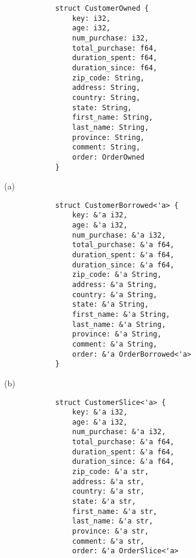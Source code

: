 \begin{figure}[htb]
    \begin{minipage}[t]{0.2\linewidth}\centering
        \begin{lstlisting}
            struct CustomerOwned {
                key: i32,
                age: i32,
                num_purchase: i32,
                total_purchase: f64,
                duration_spent: f64, 
                duration_since: f64,
                zip_code: String,
                address: String,
                country: String,
                state: String,
                first_name: String,
                last_name: String,
                province: String,
                comment: String, 
                order: OrderOwned
            }
        \end{lstlisting}
      \medskip
      \centerline{(a)}
    \end{minipage}\hfill
    \begin{minipage}[t]{0.6\linewidth}\centering
        \begin{lstlisting}
            struct CustomerBorrowed<'a> {
                key: &'a i32,
                age: &'a i32,
                num_purchase: &'a i32,
                total_purchase: &'a f64,
                duration_spent: &'a f64, 
                duration_since: &'a f64,
                zip_code: &'a String,
                address: &'a String,
                country: &'a String,
                state: &'a String,
                first_name: &'a String,
                last_name: &'a String,
                province: &'a String,
                comment: &'a String, 
                order: &'a OrderBorrowed<'a>
            }
        \end{lstlisting}
      \medskip
      \centerline{(b)}
    \end{minipage}
    \begin{minipage}[t]{0.2\linewidth}\centering
        \begin{lstlisting}
            struct CustomerSlice<'a> {
                key: &'a i32,
                age: &'a i32,
                num_purchase: &'a i32,
                total_purchase: &'a f64,
                duration_spent: &'a f64, 
                duration_since: &'a f64,
                zip_code: &'a str,
                address: &'a str,
                country: &'a str, 
                state: &'a str,
                first_name: &'a str,
                last_name: &'a str,
                province: &'a str,
                comment: &'a str,
                order: &'a OrderSlice<'a>

\end{lstlisting}
\end{minipage}
\end{figure}
